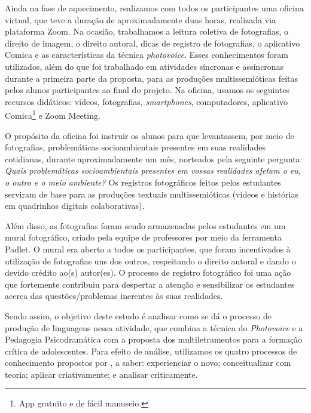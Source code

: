 Ainda na fase de aquecimento, realizamos com todos os participantes uma oficina virtual, que teve a duração de aproximadamente duas horas, realizada via plataforma Zoom. Na ocasião, trabalhamos a leitura coletiva de fotografias, o direito de imagem, o direito autoral, dicas de registro de fotografias, o aplicativo Comica e as características da técnica \textit{photovoice}. Esses conhecimentos foram utilizados, além do que foi trabalhado em atividades síncronas e assíncronas durante a primeira parte da proposta, para as produções multissemióticas feitas pelos alunos participantes ao final do projeto. Na oficina, usamos os seguintes recursos didáticos: vídeos, fotografias, \textit{smartphones}, computadores, aplicativo Comica\footnote{App gratuito e de fácil manuseio.} e Zoom Meeting.

O propósito da oficina foi instruir os alunos para que levantassem, por meio de fotografias, problemáticas socioambientais presentes em suas realidades cotidianas, durante aproximadamente um mês, norteados pela seguinte pergunta: \textit{Quais problemáticas socioambientais presentes em vossas realidades afetam o eu, o outro e o meio ambiente?} Os registros fotográficos feitos pelos estudantes serviram de base para as produções textuais multissemióticas (vídeos e histórias em quadrinhos digitais colaborativas).

Além disso, as fotografias foram sendo armazenadas pelos estudantes em um mural fotográfico, criado pela equipe de professores por meio da ferramenta Padlet. O mural era aberto a todos os participantes, que foram incentivados à utilização de fotografias uns dos outros, respeitando o direito autoral e dando o devido crédito ao(s) autor(es). O processo de registro fotográfico foi uma ação que fortemente contribuiu para despertar a atenção e sensibilizar os estudantes acerca das questões/problemas inerentes às suas realidades.

Sendo assim, o objetivo deste estudo é analisar como se dá o processo de produção de linguagens nessa atividade, que combina a técnica do \textit{Photovoice} e a Pedagogia Psicodramática com a proposta dos multiletramentos para a formação crítica de adolescentes. Para efeito de análise, utilizamos os quatro processos de conhecimento propostos por \textcite{cope_letramentos_2020}, a saber: experienciar o novo; conceitualizar com teoria; aplicar criativamente; e analisar criticamente.

